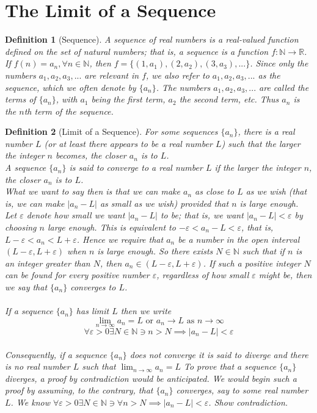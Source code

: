 \documentclass[10pt]{report}
\newtheorem{def2}{Definition}[section]
\newcommand{\eps}{\varepsilon}
\begin{document}
\section{The Limit of a Sequence}
\begin{def2}[Sequence]
A sequence of real numbers is a real-valued function defined on the set of natural numbers; that is, a sequence is a function $f:\mathbb{N}\to \mathbb{R}$. If $f(n)=a_n, \forall n\in \mathbb{N}$, then $f = \{(1,a_1),(2,a_2),(3,a_3),...\}$. Since only the numbers $a_1, a_2, a_3,...$ are relevant in $f$, we also refer to $a_1, a_2, a_3,...$ as the sequence, which we often denote by $\{a_n\}$. The numbers $a_1, a_2, a_3,...$ are called the terms of $\{a_n\}$, with $a_1$ being the first term, $a_2$ the second term, etc. Thus $a_n$ is the $n$th term of the sequence.
\end{def2}
\begin{def2}[Limit of a Sequence]
For some sequences $\{a_n\}$, there is a real number $L$ (or at least there appears to be a real number $L$) such that the larger the integer $n$ becomes, the closer $a_n$ is to $L$. \\
A sequence $\{a_n\}$ is said to converge to a real number $L$ if the larger the integer $n$, the closer $a_n$ is to $L$.\\
What we want to say then is that we can make $a_n$ as close to $L$ as we wish (that is, we can make $|a_n - L|$ as small as we wish) provided that $n$ is large enough. Let $\eps$ denote how small we want $|a_n-L|$ to be; that is, we want $|a_n-L|<\eps$ by choosing $n$ large enough. This is equivalent to $-\eps<a_n-L<\eps$, that is, $L-\eps <a_n<L+\eps$. Hence we require that $a_n$ be a number in the open interval $(L-\eps,L+\eps)$ when $n$ is large enough. So there exists $N\in \mathbb{N}$ such that if $n$ is an integer greater than $N$, then $a_n\in (L-\eps, L+\eps)$. If such a positive integer $N$ can be found for every positive number $\eps$, regardless of how small $\eps$ might be, then we say that $\{a_n\}$ converges to $L$.\\\\

If a sequence $\{a_n\}$ has limit $L$ then we write
$$\lim_{n\to \infty} a_n = L \text{   or   } a_n \to L \text{ as } n\to \infty$$
$$\forall \eps > 0 \exists N\in\mathbb{N} \ni n>N\implies |a_n - L| < \eps$$\\
Consequently, if a sequence $\{a_n\}$ does not converge it is said to diverge and there is no real number $L$ such that $\lim_{n\to \infty} a_n=L$
To prove that a sequence $\{a_n\}$ diverges, a proof by contradiction would be anticipated. We would begin such a proof by assuming, to the contrary, that $\{a_n\}$ converges, say to some real number $L$. We know $\forall \eps >0 \exists N\in \mathbb{N}\ni \forall n>N\implies |a_n-L|<\eps$. Show contradiction.
\end{def2}
\end{document}
